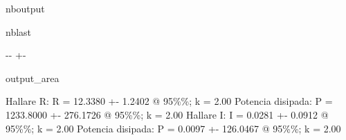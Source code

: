 \documentclass[letterpaper,10pt,english]{sphinxmanual}
\begin{document}
\begin{sphinxuseclass}{nboutput}
\begin{sphinxuseclass}{nblast}
{

\kern-\sphinxverbatimsmallskipamount\kern-\baselineskip
\kern+\FrameHeightAdjust\kern-\fboxrule
\vspace{\nbsphinxcodecellspacing}

\begin{sphinxuseclass}{output_area}
\begin{sphinxuseclass}{}


\begin{sphinxVerbatim}[commandchars=\\\{\}]
Hallare R:
R = 12.3380 +- 1.2402 @ 95\%\%; k = 2.00
Potencia disipada:
P = 1233.8000 +- 276.1726 @ 95\%\%; k = 2.00
Hallare I:
I = 0.0281 +- 0.0912 @ 95\%\%; k = 2.00
Potencia disipada:
P = 0.0097 +- 126.0467 @ 95\%\%; k = 2.00
\end{sphinxVerbatim}



\end{sphinxuseclass}
\end{sphinxuseclass}
}

\end{sphinxuseclass}
\end{sphinxuseclass}
\sphinxstepscope
\end{document}
